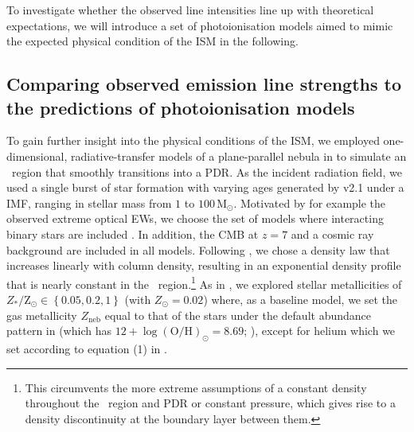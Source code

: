 To investigate whether the observed line intensities line up with theoretical expectations, we will introduce a set of photoionisation models aimed to mimic the expected physical condition of the ISM in the following.

\subsection{Comparing observed emission line strengths to the predictions of photoionisation models}
\label{chDssec:Discussion:OIII/CII_photoionisation_models}

To gain further insight into the physical conditions of the ISM, we employed one-dimensional, radiative-transfer models of a plane-parallel nebula in  \citep[v17.02;][]{2017RMxAA..53..385F} to simulate an \HII\ region that smoothly transitions into a PDR. As the incident radiation field, we used a single burst of star formation with varying ages generated by  v2.1 \citep{2017PASA...34...58E} under a \citeauthor{1955ApJ...121..161S} IMF, ranging in stellar mass from $1$ to $100 \, \mathrm{M_\odot}$. Motivated by for example the observed extreme optical EWs, we choose the set of  models where interacting binary stars are included \citep[significantly boosting the ionising flux; see e.g.][]{2016MNRAS.456..485S}. In addition, the CMB at $z=7$ and a cosmic ray background \citep[crucial to the PDR physics; see][]{2005AAS...207.8117A} are included in all models. Following \citet{2019A&A...626A..23C}, we chose a density law that increases linearly with column density, resulting in an exponential density profile that is nearly constant in the \HII\ region.\footnote{This circumvents the more extreme assumptions of a constant density throughout the \HII\ region and PDR or constant pressure, which gives rise to a density discontinuity at the boundary layer between them.} As in \citet{2020ApJ...896...93H}, we explored stellar metallicities of $Z_*/\mathrm{Z_\odot} \in \left\{0.05, 0.2, 1 \right\}$ (with $Z_\odot = 0.02$) where, as a baseline model, we set the gas metallicity $Z_\text{neb}$ equal to that of the stars under the default abundance pattern in  (which has $12 + \log \left ( \text{O/H} \right)_\odot = 8.69$; \citealt{2009ARA&A..47..481A}), except for helium which we set according to equation (1) in \citet{2004ApJS..153...75G}.

